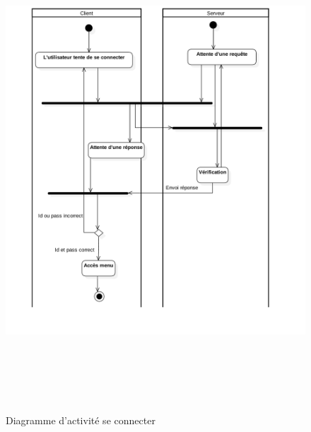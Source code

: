 \documentclass[12pt,a4paper]{article}
\begin{document}
\appendix 
\begin{center}
\begin{figure}[H]
    \includegraphics[height=18cm,width=18cm]{loginActi.png}
    \caption{Diagramme d'activité se connecter}
    \label{fig:picture}
 \end{figure}
\end{center}
\end{document}
